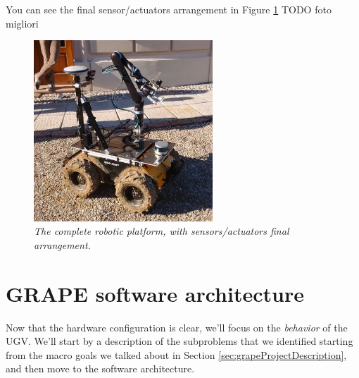 You can see the final sensor/actuators arrangement in Figure \ref{fig:disposizioneFinale} TODO foto migliori
\begin{figure}
	\centering
	\includegraphics[width=0.6\textwidth]{Images/grape_sw_hw_architecture/disposizioneFinale.jpeg}
	\caption{\textit{The complete robotic platform, with sensors/actuators final arrangement.}}
	\label{fig:disposizioneFinale}
\end{figure}
 
\section{GRAPE software architecture}\label{sec:grapeSwArch}

Now that the hardware configuration is clear, we'll focus on the \textit{behavior} of the \ac{UGV}. We'll start by a description of the subproblems that we identified starting from the macro goals we talked about in Section \ref{sec:grapeProjectDescription}, and then move to the software architecture. \\

